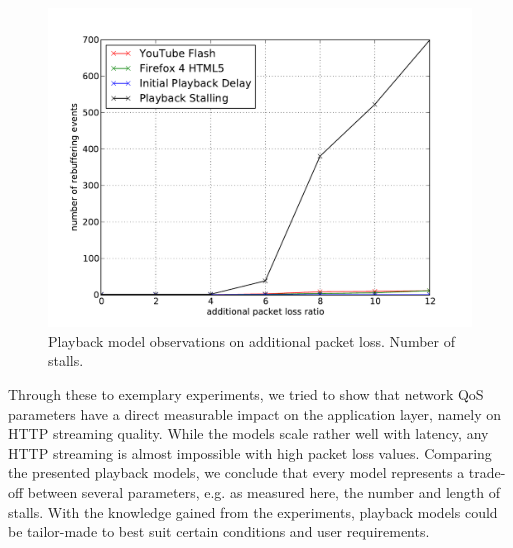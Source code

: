\begin{figure}[htb]
    \centering
    \includegraphics[width=\textwidth]{images/eval-loss4mb-frequency.pdf}
    \caption{Playback model observations on additional packet loss. Number of stalls.}
    \label{c3:fig:eval-loss-numstalls}
\end{figure}
 
Through these to exemplary experiments, we tried to show that network QoS parameters have a direct measurable impact on the application layer, namely on HTTP streaming quality. While the models scale rather well with latency, any HTTP streaming is almost impossible with high packet loss values.
Comparing the presented playback models, we conclude that every model represents a trade-off between several parameters, e.g. as measured here, the number and length of stalls. With the knowledge gained from the experiments, playback models could be tailor-made to best suit certain conditions and user requirements. 

